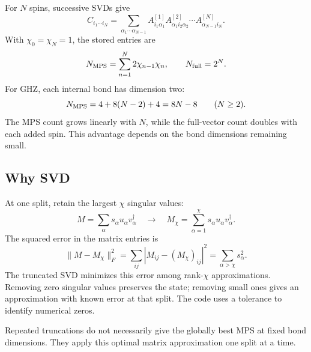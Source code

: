 \documentclass[11pt]{article}
\begin{document}
For $N$ spins, successive SVDs give
\begin{equation}
C_{i_1\cdots i_N}=\sum_{\alpha_1\cdots\alpha_{N-1}}
A^{[1]}_{i_1\alpha_1}A^{[2]}_{\alpha_1i_2\alpha_2}\cdots
A^{[N]}_{\alpha_{N-1}i_N}.
\end{equation}
With $\chi_0=\chi_N=1$, the stored entries are
\begin{equation}
N_{\rm MPS}=\sum_{n=1}^N2\chi_{n-1}\chi_n,\qquad N_{\rm full}=2^N.
\end{equation}
For GHZ, each internal bond has dimension two:
\begin{equation}
N_{\rm MPS}=4+8(N-2)+4=8N-8\qquad(N\geq2).
\end{equation}
The MPS count grows linearly with $N$, while the full-vector count doubles with each added spin. This advantage depends on the bond dimensions remaining small.

\subsection*{Why SVD}
At one split, retain the largest $\chi$ singular values:
\begin{equation}
M=\sum_\alpha s_\alpha u_\alpha v_\alpha^\dagger
\quad\longrightarrow\quad
M_\chi=\sum_{\alpha=1}^\chi s_\alpha u_\alpha v_\alpha^\dagger.
\end{equation}
The squared error in the matrix entries is
\begin{equation}
\|M-M_\chi\|_F^2
=\sum_{ij}|M_{ij}-(M_\chi)_{ij}|^2
=\sum_{\alpha>\chi}s_\alpha^2.
\end{equation}
The truncated SVD minimizes this error among rank-$\chi$ approximations. Removing zero singular values preserves the state; removing small ones gives an approximation with known error at that split. The code uses a tolerance to identify numerical zeros.

Repeated truncations do not necessarily give the globally best MPS at fixed bond dimensions. They apply this optimal matrix approximation one split at a time.
\end{document}
